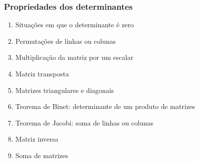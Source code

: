 \documentclass[pdftex, brazil, aspectratio=169]{beamer}
\begin{document}
\begin{frame}[t]
  \frametitle{Propriedades dos determinantes}
  \begin{enumerate}
    \item Situações em que o determinante é zero
    \item Permutações de linhas ou colunas
    \item Multiplicação da matriz por um escalar
    \item Matriz transposta
    \item Matrizes triangulares e diagonais
    \item Teorema de Binet: determinante de um produto de matrizes
    \item Teorema de Jacobi: soma de linhas ou colunas
    \item Matriz inversa
    \item Soma de matrizes
  \end{enumerate}
\end{frame}
\end{document}
